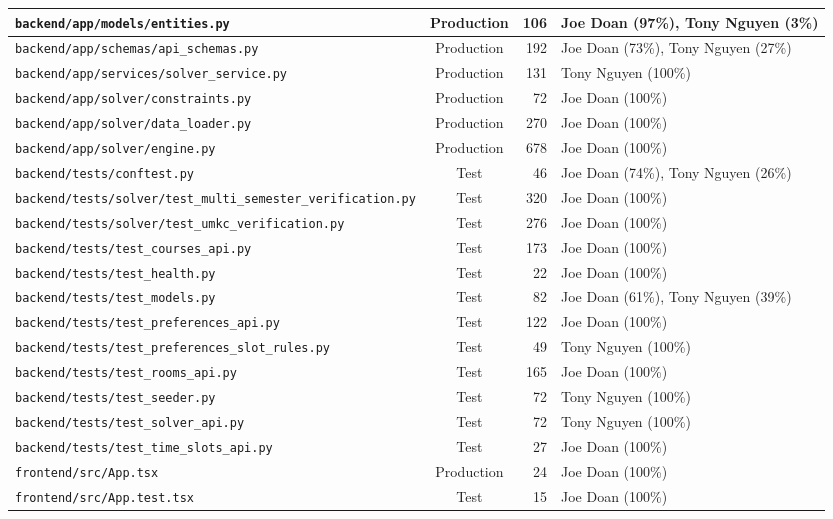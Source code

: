 \documentclass[10pt,letterpaper]{article}
\begin{document}
\begin{longtable}{|p{7.1cm}|c|r|p{6.2cm}|}
\texttt{backend/app/models/entities.py} & Production & 106 & Joe Doan (97\%), Tony Nguyen (3\%) \\ \hline
\texttt{backend/app/schemas/api\_schemas.py} & Production & 192 & Joe Doan (73\%), Tony Nguyen (27\%) \\ \hline
\texttt{backend/app/services/solver\_service.py} & Production & 131 & Tony Nguyen (100\%) \\ \hline
\texttt{backend/app/solver/constraints.py} & Production & 72 & Joe Doan (100\%) \\ \hline
\texttt{backend/app/solver/data\_loader.py} & Production & 270 & Joe Doan (100\%) \\ \hline
\texttt{backend/app/solver/engine.py} & Production & 678 & Joe Doan (100\%) \\ \hline
\texttt{backend/tests/conftest.py} & Test & 46 & Joe Doan (74\%), Tony Nguyen (26\%) \\ \hline
\texttt{backend/tests/solver/test\_multi\_semester\_verification.py} & Test & 320 & Joe Doan (100\%) \\ \hline
\texttt{backend/tests/solver/test\_umkc\_verification.py} & Test & 276 & Joe Doan (100\%) \\ \hline
\texttt{backend/tests/test\_courses\_api.py} & Test & 173 & Joe Doan (100\%) \\ \hline
\texttt{backend/tests/test\_health.py} & Test & 22 & Joe Doan (100\%) \\ \hline
\texttt{backend/tests/test\_models.py} & Test & 82 & Joe Doan (61\%), Tony Nguyen (39\%) \\ \hline
\texttt{backend/tests/test\_preferences\_api.py} & Test & 122 & Joe Doan (100\%) \\ \hline
\texttt{backend/tests/test\_preferences\_slot\_rules.py} & Test & 49 & Tony Nguyen (100\%) \\ \hline
\texttt{backend/tests/test\_rooms\_api.py} & Test & 165 & Joe Doan (100\%) \\ \hline
\texttt{backend/tests/test\_seeder.py} & Test & 72 & Tony Nguyen (100\%) \\ \hline
\texttt{backend/tests/test\_solver\_api.py} & Test & 72 & Tony Nguyen (100\%) \\ \hline
\texttt{backend/tests/test\_time\_slots\_api.py} & Test & 27 & Joe Doan (100\%) \\ \hline
\texttt{frontend/src/App.tsx} & Production & 24 & Joe Doan (100\%) \\ \hline
\texttt{frontend/src/App.test.tsx} & Test & 15 & Joe Doan (100\%) \\ \hline

\end{longtable}
\end{document}
